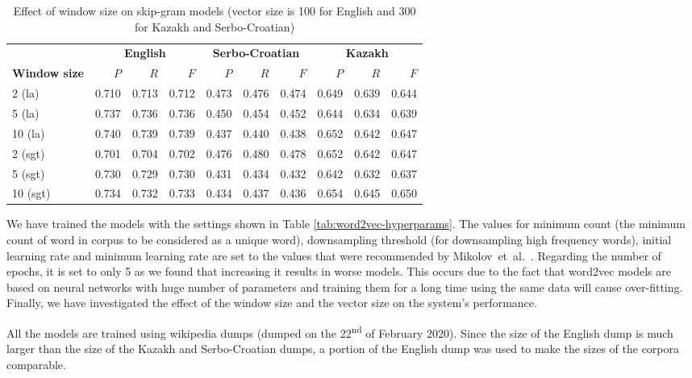 \documentclass[free]{flammie}
\begin{document}
\begin{table*}[h]
\caption{Effect of window size on skip-gram models (vector size is 100 for English and 300 for Kazakh and Serbo-Croatian)}
\label{tab:window}
\centering
\begin{tabular}{lrrrrrrrrr}
\toprule &\multicolumn{3}{c}{ \textbf{English}} &\multicolumn{3}{c}{ \textbf{Serbo-Croatian}} &\multicolumn{3}{c}{ \textbf{Kazakh}}\\
\textbf{Window size} & $P$ & $R$ & $F$ & $P$ & $R$ & $F$ & $P$ & $R$ & $F$\\
\midrule
2 (la)& 0.710 & 0.713 & 0.712 & 0.473 & 0.476 & 0.474 & 0.649 & 0.639 & 0.644 \\
5 (la)& 0.737 & 0.736 & 0.736 & 0.450 & 0.454 & 0.452 & 0.644 & 0.634 & 0.639 \\
10 (la)& 0.740 & 0.739 & 0.739 & 0.437 & 0.440 & 0.438 & 0.652 & 0.642 & 0.647 \\
\midrule
2 (sgt)& 0.701 & 0.704 & 0.702 & 0.476 & 0.480 & 0.478 & 0.652 & 0.642 & 0.647 \\
5 (sgt)& 0.730 & 0.729 & 0.730 & 0.431 & 0.434 & 0.432 & 0.642 & 0.632 & 0.637 \\
10 (sgt)& 0.734 & 0.732 & 0.733 & 0.434 & 0.437 & 0.436 & 0.654 & 0.645 & 0.650 \\
\bottomrule
\end{tabular}
\end{table*}


We have trained the models with the settings shown in Table
\ref{tab:word2vec-hyperparams}. The values for minimum count (the minimum count
of word in corpus to be considered as a unique word), downsampling threshold
(for downsampling high frequency words), initial learning rate and minimum
learning rate are set to the values that were recommended by
Mikolov~et~al.~\cite{mikolov2013efficient}.  Regarding the number of
epochs, it is set to only 5 as we found that increasing it results in worse
models. This occurs due to the fact that word2vec models are based on neural
networks with huge number of parameters and training them for a long time using
the same data will cause over-fitting. Finally, we have investigated the effect
of the window size and the vector size on the system's performance.

All the models are trained using wikipedia dumps (dumped on the
22\textsuperscript{nd} of February 2020). Since the size of the English dump is
much larger than the size of the Kazakh and Serbo-Croatian dumps, a portion of
the English dump was used to make the sizes of the corpora comparable.
\end{document}
